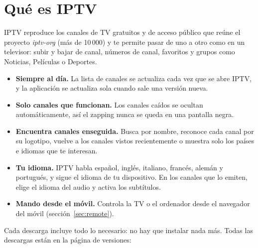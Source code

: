 \newcommand{\GuideLang}{spanish}
\newcommand{\GuideTitle}{Guía rápida}
\newcommand{\TipLabel}{Consejo.}




\section{Qué es IPTV}

IPTV reproduce los canales de TV gratuitos y de acceso público que reúne el
proyecto \emph{iptv-org} (más de 10\,000) y te permite pasar de uno a otro
como en un televisor: subir y bajar de canal, números de canal, favoritos y
grupos como Noticias, Películas o Deportes.

\begin{itemize}
  \item \textbf{Siempre al día.} La lista de canales se actualiza cada vez
        que se abre IPTV, y la aplicación se actualiza sola cuando sale una
        versión nueva.
  \item \textbf{Solo canales que funcionan.} Los canales caídos se ocultan
        automáticamente, así el zapping nunca se queda en una pantalla negra.
  \item \textbf{Encuentra canales enseguida.} Busca por nombre, reconoce cada
        canal por su logotipo, vuelve a los canales vistos recientemente o
        muestra solo los países e idiomas que te interesan.
  \item \textbf{Tu idioma.} IPTV habla español, inglés, italiano, francés,
        alemán y portugués, y sigue el idioma de tu dispositivo. En los
        canales que lo emiten, elige el idioma del audio y activa los
        subtítulos.
  \item \textbf{Mando desde el móvil.} Controla la TV o el ordenador desde el
        navegador del móvil (sección~\ref{sec:remote}).
\end{itemize}

Cada descarga incluye todo lo necesario: no hay que instalar nada más. Todas
las descargas están en la página de versiones:

\begin{center}
  \download
\end{center}

